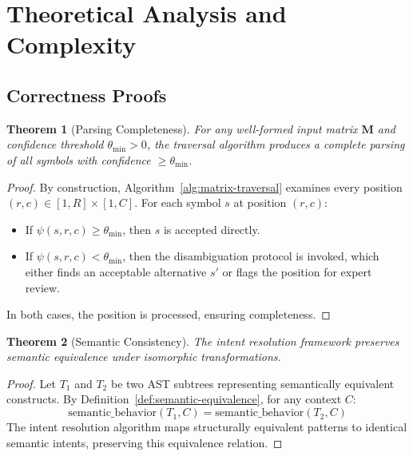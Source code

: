 \documentclass[11pt,a4paper]{article}
\newtheorem{theorem}{Theorem}[section]
\theoremstyle{definition}
\theoremstyle{remark}
\newcommand{\confidence}[3]{\ensuremath{\psi(#1, #2, #3)}}
\newcommand{\riftmatrix}[1]{\ensuremath{\mathbf{#1}}}
\begin{document}
\section{Theoretical Analysis and Complexity}
\label{sec:theoretical-analysis}

\subsection{Correctness Proofs}
\label{subsec:correctness-proofs}

\begin{theorem}[Parsing Completeness]
\label{thm:parsing-completeness}
For any well-formed input matrix $\riftmatrix{M}$ and confidence threshold $\theta_{\min} > 0$, the traversal algorithm produces a complete parsing of all symbols with confidence $\geq \theta_{\min}$.
\end{theorem}

\begin{proof}
By construction, Algorithm~\ref{alg:matrix-traversal} examines every position $(r,c) \in [1,R] \times [1,C]$. For each symbol $s$ at position $(r,c)$:
\begin{itemize}
\item If $\confidence{s}{r}{c} \geq \theta_{\min}$, then $s$ is accepted directly.
\item If $\confidence{s}{r}{c} < \theta_{\min}$, then the disambiguation protocol is invoked, which either finds an acceptable alternative $s'$ or flags the position for expert review.
\end{itemize}
In both cases, the position is processed, ensuring completeness.
\end{proof}

\begin{theorem}[Semantic Consistency]
\label{thm:semantic-consistency}
The intent resolution framework preserves semantic equivalence\label{def:semantic-equivalence} under isomorphic transformations.
\end{theorem}

\begin{proof}
Let $T_1$ and $T_2$ be two AST subtrees representing semantically equivalent constructs. By Definition~\ref{def:semantic-equivalence}, for any context $C$:
$$\text{semantic\_behavior}(T_1, C) = \text{semantic\_behavior}(T_2, C)$$
The intent resolution algorithm maps structurally equivalent patterns to identical semantic intents, preserving this equivalence relation.
\end{proof}
\end{document}
